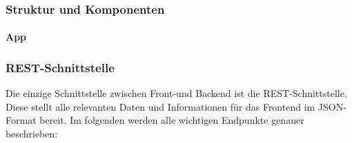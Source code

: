 \documentclass[conference,a4paper]{cs-techrep}
\begin{document}
\subsubsection{Struktur und Komponenten}

\paragraph{App}

\subsubsection{REST-Schnittstelle}
Die einzige Schnittstelle zwischen Front-und Backend ist die REST-Schnittstelle. Diese stellt alle relevanten Daten und Informationen für das Frontend im JSON-Format bereit. Im folgenden werden alle wichtigen Endpunkte genauer beschrieben:

\end{document}
